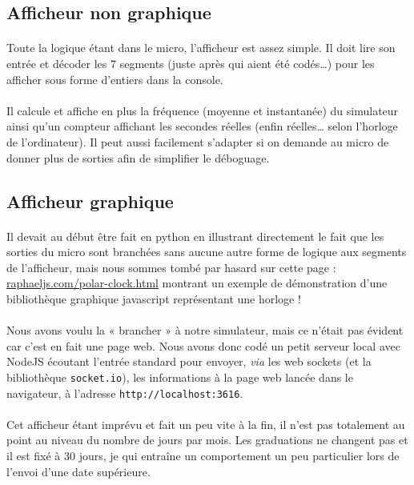 \documentclass{article}
\begin{document}
\subsection{Afficheur non graphique}
\paragraph{}Toute la logique étant dans le micro, l'afficheur est assez simple. Il doit lire son entrée et décoder les 7 segments (juste après qui aient été codés…) pour les afficher sous forme d'entiers dans la console.

\paragraph{}Il calcule et affiche en plus la fréquence (moyenne et instantanée) du simulateur ainsi qu'un compteur affichant les secondes réelles (enfin réelles… selon l'horloge de l'ordinateur). Il peut aussi facilement s'adapter si on demande au micro de donner plus de sorties afin de simplifier le déboguage.

\subsection{Afficheur graphique}
\paragraph{}Il devait au début être fait en python en illustrant directement le fait que les sorties du micro sont branchées sans aucune autre forme de logique aux segments de l'afficheur, mais nous sommes tombé par hasard sur cette page : \url{raphaeljs.com/polar-clock.html} montrant un exemple de démonstration d'une bibliothèque graphique javascript représentant une horloge !

\paragraph{}Nous avons voulu la « brancher » à notre simulateur, mais ce n'était pas évident car c'est en fait une page web. Nous avons donc codé un petit serveur local avec NodeJS écoutant l'entrée standard pour envoyer, \emph{via} les web sockets (et la bibliothèque \texttt{socket.io}), les informations à la page web lancée dans le navigateur, à l'adresse \texttt{http://localhost:3616}.

\paragraph{}Cet afficheur étant imprévu et fait un peu vite à la fin, il n'est pas totalement au point au niveau du nombre de jours par mois. Les graduations ne changent pas et il est fixé à 30 jours, je qui entraîne un comportement un peu particulier lors de l'envoi d'une date supérieure.
\end{document}
